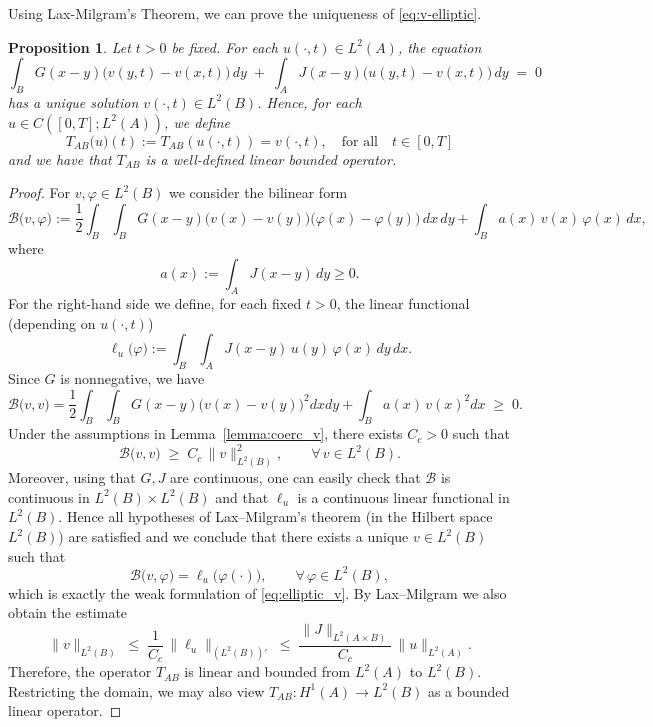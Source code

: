 \documentclass[reqno]{amsart}
\numberwithin{equation}{section}
\newtheorem{proposition}[theorem]{Proposition}
\begin{document}
Using Lax-Milgram's Theorem, we can prove the uniqueness of \eqref{eq:v-elliptic}.


\begin{proposition}\label{v(u)existence}
Let $t>0$ be fixed. For each \(u(\cdot,t)\in L^2(A)\), the equation
\begin{equation}\label{eq:elliptic_v}
\int_B G(x-y)\bigl(v(y,t)-v(x,t)\bigr)\,dy
\;+\; \int_A J(x-y)\bigl(u(y,t)-v(x,t)\bigr)\,dy \;=\; 0
\end{equation}
has a unique solution \(v(\cdot,t)\in L^2(B)\).  Hence, for each $u\in C([0,T];L^2(A))$, we define
\[ T_{AB}\bigl(u)(t):=T_{AB}(u(\cdot,t))=v(\cdot,t), \quad \text{for all}\quad  t\in [0,T]
\]
and we have that $T_{AB}$ is a well-defined linear bounded operator.
\end{proposition}

\begin{proof}For $v,\varphi\in L^2(B)$ we consider the bilinear form
\[
\mathcal{B}\bigl(v,\varphi\bigr)
:=
\frac{1}{2}\int_{B}\int_{B} G(x-y)\bigl(v(x)-v(y)\bigr)\bigl(\varphi(x)-\varphi(y)\bigr)\,dx\,dy
+ \int_B a(x)\,v(x)\,\varphi(x)\,dx,
\]
where
\[
a(x):=\int_A J(x-y)\,dy \ge 0 .
\]
For the right-hand side we define, for each fixed $t>0$, the linear functional (depending on \(u(\cdot,t)\))
\[
\ell_{u}\bigl(\varphi\bigr)
:= \int_B\int_A J(x-y)\,u(y)\,\varphi(x)\,dy\,dx.
\]
Since \(G\) is nonnegative, we have
\[
\mathcal{B}\bigl(v,v\bigr)
= \frac{1}{2}\int_{B}\int_{B} G(x-y)\bigl(v(x)-v(y)\bigr)^2 dxdy
+ \int_B a(x)\, v(x)^2 dx \;\ge\; 0.
\]
Under the assumptions in Lemma~\ref{lemma:coerc_v}, there exists \(C_c>0\) such that
\[
\mathcal{B}\bigl(v,v\bigr) \;\ge\; C_c\,\|v\|_{L^2(B)}^2,
\qquad \forall\,v\in L^2(B).
\]
Moreover, using that $G,J$ are continuous, one can easily check that
\(\mathcal{B}\) is continuous in \(L^2(B)\times L^2(B)\) and that
\(\ell_{u}\) is a continuous linear functional in \(L^2(B)\). 
Hence all hypotheses of Lax--Milgram's theorem (in the Hilbert space \(L^2(B)\))
are satisfied and we conclude that there exists a unique \(v\in L^2(B)\) such that
\[
\mathcal{B}\bigl(v,\varphi\bigr)
= \ell_{u}\bigl(\varphi(\cdot)\bigr),
\qquad \forall\,\varphi\in L^2(B),
\]
which is exactly the weak formulation of \eqref{eq:elliptic_v}. By Lax--Milgram we
also obtain the estimate
\[
\|v\|_{L^2(B)}
\;\le\; \frac{1}{C_c}\,\|\ell_{u}\|_{(L^2(B))'}
\;\le\; \frac{\|J\|_{L^2(A\times B)}}{C_c}\,\|u\|_{L^2(A)}.
\]
Therefore, the operator \(T_{AB}\) is linear and bounded from
\(L^2(A)\) to \(L^2(B)\). Restricting the domain, we may also view
\(T_{AB}:H^1(A)\to L^2(B)\) as a bounded linear operator.
\end{proof}
\end{document}
